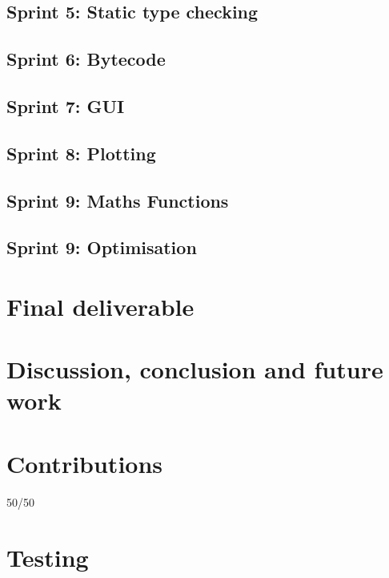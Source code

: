 \documentclass[a4paper, oneside, 11pt]{report}
\begin{document}
\section{Sprint 5: Static type checking}\label{sec:static-type-checking}

\section{Sprint 6: Bytecode}\label{sec:bytecode}

\section{Sprint 7: GUI}\label{sec:gui}

\section{Sprint 8: Plotting}\label{sec:plotting1}

\section{Sprint 9: Maths Functions}\label{sec:maths-funcs}

\section{Sprint 9: Optimisation}\label{sec:optimisation1}

\chapter{Final deliverable}\label{ch:impl}


\chapter{Discussion, conclusion and future work}\label{ch:discussion-conclusion-and-future-work}





\appendix
\chapter{Contributions}\label{ch:contributions}

50/50

\chapter{Testing}\label{ch:test}
\end{document}
